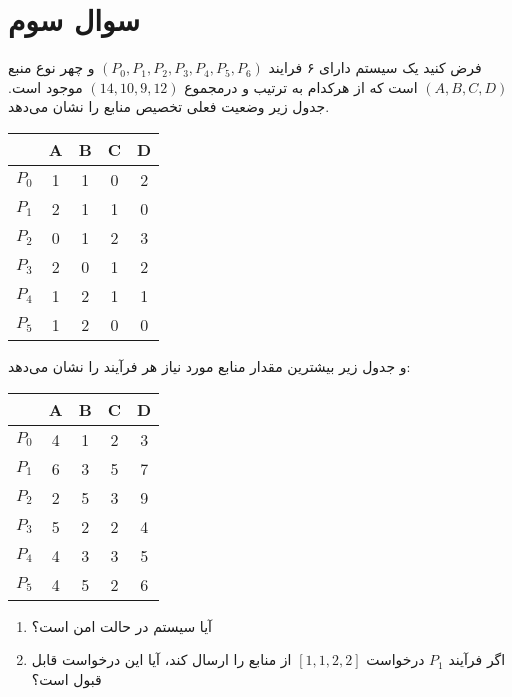 \section{سوال سوم}


فرض کنید یک سیستم دارای ۶ فرایند $ (P_0, P_1, P_2, P_3, P_4, P_5, P_6) $ و چهر نوع منبع  $(A, B, C, D)$ است که از هرکدام به ترتیب و درمجموع $ (14, 10, 9, 12) $ موجود است. جدول زیر وضعیت فعلی تخصیص منابع را نشان می‌دهد.



\begin{center}
	\begin{tabular}{||c|c|c|c|c||}
		\hline 
		& A & B & C & D\\
		\hline \hline
		$P_0$ & 1 & 1 & 0 & 2 \\
		$P_1$ & 2 & 1 & 1 & 0 \\
		$P_2$ & 0 & 1 & 2 & 3 \\
		$P_3$ & 2 & 0 & 1 & 2 \\
		$P_4$ & 1 & 2 & 1 & 1 \\
		$P_5$ & 1 & 2 & 0 & 0 \\
		\hline
	\end{tabular}
\end{center}


و جدول زیر بیشترین مقدار منابع مورد نیاز هر فرآیند را نشان می‌دهد:

\begin{center}
	\begin{tabular}{||c|c|c|c|c||}
		\hline 
		& A & B & C & D\\
		\hline \hline
		$P_0$ & 4 & 1 & 2 & 3 \\
		$P_1$ & 6 & 3 & 5 & 7 \\
		$P_2$ & 2 & 5 & 3 & 9 \\
		$P_3$ & 5 & 2 & 2 & 4 \\
		$P_4$ & 4 & 3 & 3 & 5 \\
		$P_5$ & 4 & 5 & 2 & 6 \\
		\hline
	\end{tabular}
\end{center}


\begin{enumerate}
	\item 
	آیا سیستم در حالت امن است؟
	
	
	
	\item  
	اگر فرآیند $P_1 $ درخواست $ [1, 1, 2, 2] $ از منابع را ارسال کند، آیا این درخواست قابل قبول است؟
	
	
\end{enumerate}